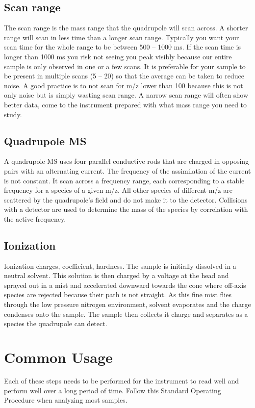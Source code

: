 \documentclass[12pt, letterpaper]{article}
\begin{document}
\subsection{Scan range}
The scan range is the mass range that the quadrupole will scan across.
A shorter range will scan in less time than a longer scan range.
Typically you want your scan time for the whole range to be between 500 -- 1000 ms.
If the scan time is longer than 1000 ms you risk not seeing you peak visibly because our entire sample is only observed in one or a few scans.
It is preferable for your sample to be present in multiple scans (5 -- 20) so that the average can be taken to reduce noise.
A good practice is to not scan for m/z lower than 100 because this is not only noise but is simply wasting scan range.
A narrow scan range will often show better data, come to the instrument prepared with what mass range you need to study.

\subsection{Quadrupole MS}
A quadrupole MS uses four parallel conductive rods that are charged in opposing pairs with an alternating current.
The frequency of the assimilation of the current is not constant.
It scan across a frequency range, each corresponding to a stable frequency for a species of a given m/z.
All other species of different m/z are scattered by the quadrupole's field and do not make it to the detector.
Collisions with a detector are used to determine the mass of the species by correlation with the active frequency.

\subsection{Ionization}
Ionization charges, coefficient, hardness.
The sample is initially dissolved in a neutral solvent. 
This solution is then charged by a voltage at the head and sprayed out in a mist and accelerated downward towards the cone where off-axis species are rejected because their path is not straight.
As this fine mist flies through the low pressure nitrogen environment, solvent evaporates and the charge condenses onto the sample.
The sample then collects it charge and separates as a species the quadrupole can detect.


\section{Common Usage}
Each of these steps needs to be performed for the instrument to read well and perform well over a long period of time.
Follow this Standard Operating Procedure when analyzing most samples.
\end{document}
